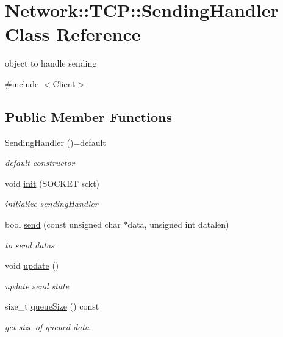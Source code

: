 \hypertarget{class_network_1_1_t_c_p_1_1_sending_handler}{}\section{Network\+:\+:T\+CP\+:\+:Sending\+Handler Class Reference}
\label{class_network_1_1_t_c_p_1_1_sending_handler}


object to handle sending  




{\ttfamily \#include $<$Client$>$}

\subsection*{Public Member Functions}
\begin{DoxyCompactItemize}
\item 
\mbox{\label{class_network_1_1_t_c_p_1_1_sending_handler_ab4f15ba6e368f46c1416acafd8211628}} 
\hyperlink{class_network_1_1_t_c_p_1_1_sending_handler_ab4f15ba6e368f46c1416acafd8211628}{Sending\+Handler} ()=default
\begin{DoxyCompactList}\small\item\em default constructor \end{DoxyCompactList}\item 
void \hyperlink{class_network_1_1_t_c_p_1_1_sending_handler_a9d46cbd0e3bb87998de28f7afc494174}{init} (S\+O\+C\+K\+ET sckt)
\begin{DoxyCompactList}\small\item\em initialize sending\+Handler \end{DoxyCompactList}\item 
bool \hyperlink{class_network_1_1_t_c_p_1_1_sending_handler_afd82361ce8f24ae48ba9c586fec85b6c}{send} (const unsigned char $\ast$data, unsigned int datalen)
\begin{DoxyCompactList}\small\item\em to send datas \end{DoxyCompactList}\item 
\mbox{\label{class_network_1_1_t_c_p_1_1_sending_handler_a234c0bee61f02cbc6210bdf339c45a62}} 
void \hyperlink{class_network_1_1_t_c_p_1_1_sending_handler_a234c0bee61f02cbc6210bdf339c45a62}{update} ()
\begin{DoxyCompactList}\small\item\em update send state \end{DoxyCompactList}\item 
size\+\_\+t \hyperlink{class_network_1_1_t_c_p_1_1_sending_handler_a0ee93a4a671c89ca30ea191fdcacc745}{queue\+Size} () const
\begin{DoxyCompactList}\small\item\em get size of queued data \end{DoxyCompactList}\end{DoxyCompactItemize}


